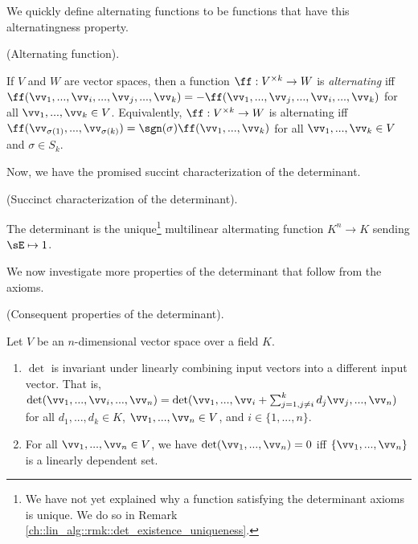 We quickly define alternating functions to be functions that have this alternatingness property.

\begin{defn}
    (Alternating function).

    If $V$ and $W$ are vector spaces, then a function $\ff:V^{\times k} \rightarrow W$ is \textit{alternating} iff \\ ${\ff(\vv_1, ..., \vv_i, ..., \vv_j, ..., \vv_k) = -\ff(\vv_1, ..., \vv_j, ..., \vv_i, ..., \vv_k)}$ for all $\vv_1, ..., \vv_k \in V$. Equivalently, $\ff:V^{\times k} \rightarrow W$ is alternating iff
    ${\ff(\vv_{\sigma(1)}, ..., \vv_{\sigma(k)}) = \sgn(\sigma) \ff(\vv_1, ..., \vv_k)}$ for all $\vv_1, ..., \vv_k \in V$ and $\sigma \in S_k$.
\end{defn}

Now, we have the promised succint characterization of the determinant.

\begin{theorem}
    (Succinct characterization of the determinant).

    The determinant is the unique\footnote{We have not yet explained why a function satisfying the determinant axioms is unique. We do so in Remark \ref{ch::lin_alg::rmk::det_existence_uniqueness}.} multilinear altermating function $K^n \rightarrow K$ sending $\sE \mapsto 1$.
\end{theorem}

We now investigate more properties of the determinant that follow from the axioms.

\begin{theorem}
\label{ch::lin_alg::thm::consequent_det_props}
    (Consequent properties of the determinant). 

    Let $V$ be an $n$-dimensional vector space over a field $K$.
    
    \begin{enumerate}
        \item $\det$ is invariant under linearly combining input vectors into a different input vector. That is, $\det(\vv_1, ..., \vv_i, ..., \vv_n) = \det(\vv_1, ..., \vv_i + \sum_{j = 1, j \neq i}^k d_j \vv_j, ..., \vv_n)$ for all $d_1, ..., d_k \in K$, $\vv_1, ..., \vv_n \in V$, and $i \in \{1, ..., n\}$.
        \item For all $\vv_1, ..., \vv_n \in V$, we have $\det(\vv_1, ..., \vv_n) = 0$ iff $\{\vv_1, ..., \vv_n\}$ is a linearly dependent set.
    \end{enumerate}
\end{theorem}

